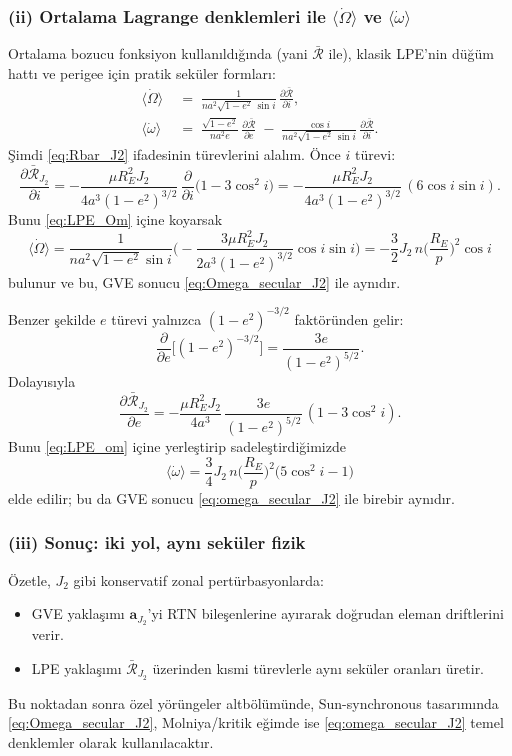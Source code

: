 \subsubsection*{(ii) Ortalama Lagrange denklemleri ile $\langle\dot\Omega\rangle$ ve $\langle\dot\omega\rangle$}
Ortalama bozucu fonksiyon kullanıldığında (yani $\bar{\mathcal R}$ ile),
klasik LPE’nin düğüm hattı ve perigee için pratik seküler formları:
\begin{subequations}\label{eq:LPE_secular_forms}
\begin{align}
\big\langle \dot\Omega \big\rangle \;&=\;
\frac{1}{n a^2\sqrt{1-e^2}\,\sin i}\,
\frac{\partial \bar{\mathcal R}}{\partial i},
\label{eq:LPE_Om}\\[4pt]
\big\langle \dot\omega \big\rangle \;&=\;
\frac{\sqrt{1-e^2}}{n a^2 e}\,
\frac{\partial \bar{\mathcal R}}{\partial e}
\;-\;
\frac{\cos i}{n a^2\sqrt{1-e^2}\,\sin i}\,
\frac{\partial \bar{\mathcal R}}{\partial i}.
\label{eq:LPE_om}
\end{align}
\end{subequations}
Şimdi \eqref{eq:Rbar_J2} ifadesinin türevlerini alalım. Önce $i$ türevi:
\[
\frac{\partial \bar{\mathcal R}_{J_2}}{\partial i}
=
-\frac{\mu R_E^2 J_2}{4a^3(1-e^2)^{3/2}}\,
\frac{\partial}{\partial i}\big(1-3\cos^2 i\big)
=
-\frac{\mu R_E^2 J_2}{4a^3(1-e^2)^{3/2}}\,(6\cos i\sin i).
\]
Bunu \eqref{eq:LPE_Om} içine koyarsak
\[
\big\langle \dot\Omega \big\rangle
=
\frac{1}{n a^2\sqrt{1-e^2}\sin i}
\Bigg(
-\frac{3\mu R_E^2 J_2}{2a^3(1-e^2)^{3/2}}\cos i\sin i
\Bigg)
=
-\frac{3}{2}J_2\,n\Big(\frac{R_E}{p}\Big)^2\cos i
\]
bulunur ve bu, GVE sonucu \eqref{eq:Omega_secular_J2} ile aynıdır.

Benzer şekilde $e$ türevi yalnızca $(1-e^2)^{-3/2}$ faktöründen gelir:
\[
\frac{\partial}{\partial e}\Big[(1-e^2)^{-3/2}\Big]
=
\frac{3e}{(1-e^2)^{5/2}}.
\]
Dolayısıyla
\[
\frac{\partial \bar{\mathcal R}_{J_2}}{\partial e}
=
-\frac{\mu R_E^2 J_2}{4a^3}\,
\frac{3e}{(1-e^2)^{5/2}}\,(1-3\cos^2 i).
\]
Bunu \eqref{eq:LPE_om} içine yerleştirip sadeleştirdiğimizde
\[
\big\langle \dot\omega \big\rangle
=
\frac{3}{4}J_2\,n\Big(\frac{R_E}{p}\Big)^2\big(5\cos^2 i - 1\big)
\]
elde edilir; bu da GVE sonucu \eqref{eq:omega_secular_J2} ile birebir aynıdır.

\subsubsection*{(iii) Sonuç: iki yol, aynı seküler fizik}
Özetle, $J_2$ gibi konservatif zonal pertürbasyonlarda:
\begin{itemize} \item GVE yaklaşımı $\mathbf a_{J_2}$’yi RTN bileşenlerine ayırarak doğrudan eleman driftlerini verir.
\item LPE yaklaşımı $\bar{\mathcal R}_{J_2}$ üzerinden kısmi türevlerle aynı seküler oranları üretir.
\end{itemize}
Bu noktadan sonra özel yörüngeler altbölümünde,
Sun-synchronous tasarımında \eqref{eq:Omega_secular_J2},
Molniya/kritik eğimde ise \eqref{eq:omega_secular_J2} temel denklemler olarak kullanılacaktır.


